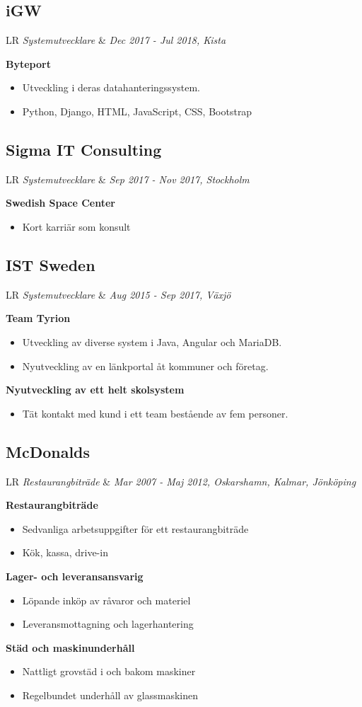 \documentclass[11pt,a4paper]{moderncv}
\newcommand*{\experienceentry}[5][1.5mm]{
    \subsection{#2} \vspace{-1.5mm}
    \begin{tabularx}{\textwidth}{LR}
        {\itshape #3} & {\itshape #4, #5}
    \end{tabularx}
    \par\addvspace{#1}
}
\begin{document}
\begin{minipage}[t]{0.62\textwidth}
\experienceentry{iGW}{Systemutvecklare}{Dec 2017 - Jul 2018}{Kista}
\textbf{Byteport}
\begin{itemize}
  \item Utveckling i deras datahanteringssystem.
  \item Python, Django, HTML, JavaScript, CSS, Bootstrap
\end{itemize}
\vspace{2.0mm}

\experienceentry{Sigma IT Consulting}{Systemutvecklare}{Sep 2017 - Nov 2017}{Stockholm}
\textbf{Swedish Space Center}
\begin{itemize}
  \item Kort karriär som konsult
\end{itemize}
\vspace{2.0mm}

\experienceentry{IST Sweden}{Systemutvecklare}{Aug 2015 - Sep 2017}{Växjö}

\textbf{Team Tyrion}
\begin{itemize}
    \item Utveckling av diverse system i Java, Angular och MariaDB.
    \item Nyutveckling av en länkportal åt kommuner och företag.
\end{itemize}
\vspace{1.0mm}

\textbf{Nyutveckling av ett helt skolsystem}
\begin{itemize}
    \item Tät kontakt med kund i ett team bestående av fem personer.
\end{itemize}
\vspace{2.0mm}

\experienceentry{McDonalds}{Restaurangbiträde}{Mar 2007 - Maj 2012}{Oskarshamn, Kalmar, Jönköping}
\vspace{-4.0mm}
\textbf{Restaurangbiträde}
\begin{itemize}
  \item Sedvanliga arbetsuppgifter för ett restaurangbiträde
  \item Kök, kassa, drive-in
\end{itemize}

\textbf{Lager- och leveransansvarig}
\begin{itemize}
  \item Löpande inköp av råvaror och materiel
  \item Leveransmottagning och lagerhantering
\end{itemize}

\textbf{Städ och maskinunderhåll}
\begin{itemize}
  \item Nattligt grovstäd i och bakom maskiner
  \item Regelbundet underhåll av glassmaskinen
\end{itemize}

\end{minipage}
\end{document}
